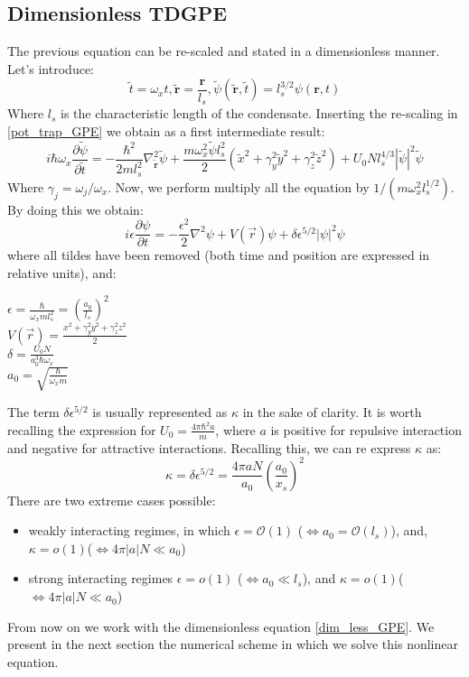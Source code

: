 \documentclass[a4paper,10pt]{article}
\begin{document}
\subsection{Dimensionless TDGPE}
The previous equation can be re-scaled and stated in a dimensionless manner. Let's introduce:
\begin{equation}
\tilde{t}=\omega_xt,      \tilde{\mathbf{r}}=\frac{\mathbf{r}}{l_s},\tilde{\psi}(\tilde{\mathbf{r}},\tilde{t})=l_s^{3/2}\psi(\mathbf{r},t)
\end{equation}
Where $l_s$ is  the characteristic length of the condensate. Inserting the re-scaling in \ref{pot_trap_GPE} we obtain as a first intermediate result:
\begin{equation}
 i \hbar \omega_x\frac{\partial \tilde{\psi}}{\partial \tilde{t}}=-\frac{\hbar^2}{2 m l_s^2}\nabla_{\tilde{\mathbf{r}}}^2 \tilde{\psi}+\frac{m\omega_x^2 \tilde{\psi}l_s^2}{2}(\tilde{x}^2+\gamma_y^2\tilde{y}^2+\gamma_z^2\tilde{z}^2)+U_0N l_s^{4/3}|\tilde{\psi}|^2\tilde{\psi} 
\end{equation}
Where $\gamma_{j}=\omega_{j}/\omega_{x}$. Now, we perform multiply all the equation by $1/(m\omega_x^2l_s^{1/2})$. By doing this we obtain:
\begin{equation}\label{dim_less_GPE}
 i \epsilon \frac{\partial \psi}{\partial t}=-\frac{\epsilon^2}{2}\nabla^2\psi+V(\vec{r})\psi+\delta \epsilon^{5/2}|\psi|^2\psi 
\end{equation}
where all tildes have been removed (both time and position are expressed in relative units), and:
\begin{center}
 $\epsilon=\frac{\hbar}{\omega_x m l_s^2}=\left(\frac{a_0}{l_s}\right)^2$\\
$ V(\vec{r})=\frac{x^2+\gamma_{y}^2y^2+\gamma_{z}^2z^2}{2}$\\
$\delta=\frac{U_0 N}{a_0^3\hbar \omega_x}$\\
$a_0=\sqrt{\frac{\hbar}{\omega_x m}}$
\end{center}
The term $\delta \epsilon^{5/2}$ is usually represented as $\kappa$ in the sake of clarity.
It is worth recalling the expression for $U_0=\frac{4 \pi \hbar^2a}{m}$, where $a$ is positive for repulsive interaction and negative for  attractive interactions. Recalling this, we can re express $\kappa$ as:
\begin{equation}
 \kappa=\delta \epsilon^{5/2}=\frac{4\pi a N}{a_0}\left(\frac{a_0}{x_s}\right)^2
\end{equation}
There are two extreme cases possible:
\begin{itemize}
 \item weakly interacting regimes, in which $\epsilon=\mathcal{O}(1)$ ($ \Leftrightarrow a_0=\mathcal{O}(l_s)$), and, $\kappa=o(1)$($\Leftrightarrow 4\pi|a|N\ll a_0$) 
 \item strong interacting regimes $\epsilon=o(1)$ ($ \Leftrightarrow a_0\ll  l_s$), and $\kappa=o(1)$($\Leftrightarrow 4\pi|a|N\ll a_0$) 
\end{itemize}
From now on we work with the dimensionless equation \ref{dim_less_GPE}. We present in the next section the numerical scheme in which we solve this nonlinear equation. 
\end{document}
